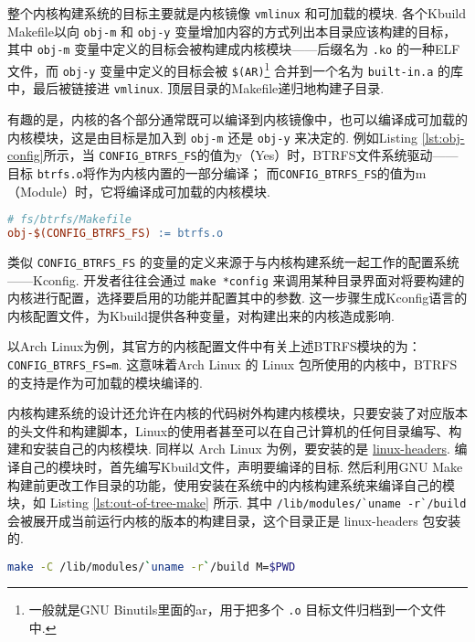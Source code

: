整个内核构建系统的目标主要就是内核镜像 \lstinline{vmlinux} 和可加载的模块.
各个Kbuild Makefile以向 \lstinline{obj-m} 和 \lstinline{obj-y} 变量增加内容的方式列出本目录应该构建的目标，
其中 \lstinline{obj-m} 变量中定义的目标会被构建成内核模块——后缀名为 \lstinline{.ko} 的一种ELF文件，而 \lstinline{obj-y} 变量中定义的目标会被 \lstinline{$(AR)}\footnote{一般就是GNU Binutils里面的ar，用于把多个 \lstinline{.o} 目标文件归档到一个文件中.} 合并到一个名为 \lstinline{built-in.a} 的库中，最后被链接进 \lstinline{vmlinux}.
顶层目录的Makefile递归地构建子目录.

有趣的是，内核的各个部分通常既可以编译到内核镜像中，也可以编译成可加载的内核模块，这是由目标是加入到 \lstinline{obj-m} 还是 \lstinline{obj-y} 来决定的.
例如Listing \ref{lst:obj-config}所示，当 \lstinline{CONFIG_BTRFS_FS}的值为y（Yes）时，BTRFS文件系统驱动——目标 \lstinline{btrfs.o}将作为内核内置的一部分编译；
而\lstinline{CONFIG_BTRFS_FS}的值为m（Module）时，它将编译成可加载的内核模块.

\begin{lstlisting}[language=make, caption=可配置的编译目标, label=lst:obj-config]
# fs/btrfs/Makefile
obj-$(CONFIG_BTRFS_FS) := btrfs.o
\end{lstlisting}

类似 \lstinline{CONFIG_BTRFS_FS} 的变量的定义来源于与内核构建系统一起工作的配置系统——Kconfig.
%
开发者往往会通过 \lstinline{make *config} 来调用某种目录界面对将要构建的内核进行配置，选择要启用的功能并配置其中的参数.
这一步骤生成Kconfig语言的内核配置文件，为Kbuild提供各种变量，对构建出来的内核造成影响.

以Arch Linux为例，其官方的内核配置文件中有关上述BTRFS模块的为：
\lstinline{CONFIG_BTRFS_FS=m}.
这意味着Arch Linux 的 Linux 包所使用的内核中，BTRFS的支持是作为可加载的模块编译的.

内核构建系统的设计还允许在内核的代码树外构建内核模块，只要安装了对应版本的头文件和构建脚本，Linux的使用者甚至可以在自己计算机的任何目录编写、构建和安装自己的内核模块.
同样以 Arch Linux 为例，要安装的是
\href{https://archlinux.org/packages/core/x86_64/linux-headers/}{linux-headers}.
编译自己的模块时，首先编写Kbuild文件，声明要编译的目标.
然后利用GNU Make构建前更改工作目录的功能，使用安装在系统中的内核构建系统来编译自己的模块，如 Listing \ref{lst:out-of-tree-make} 所示.
其中 \lstinline{/lib/modules/`uname -r`/build} 会被展开成当前运行内核的版本的构建目录，这个目录正是 linux-headers 包安装的.
\begin{lstlisting}[language=sh, caption=为本机的内核构建模块, label=lst:out-of-tree-make]
make -C /lib/modules/`uname -r`/build M=$PWD
\end{lstlisting}

